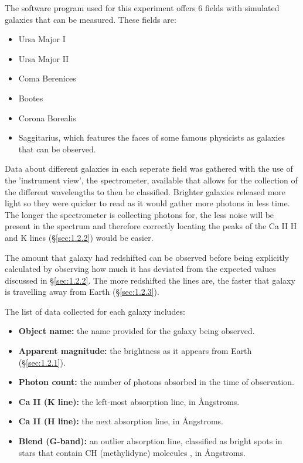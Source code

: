 \documentclass[12pt]{article}
\begin{document}
The software program used for this experiment offers 6 fields with simulated galaxies that can be measured. These fields are:

\begin{itemize}
    \item Ursa Major I
    \item Ursa Major II
    \item Coma Berenices
    \item Bootes
    \item Corona Borealis
    \item Saggitarius, which features the faces of some famous physicists as galaxies that can be observed.
\end{itemize}

Data about different galaxies in each seperate field was gathered with the use of the 'instrument view', the spectrometer, available that allows for the collection of the different
wavelengths to then be classified. Brighter galaxies released more light so they were quicker to read as it would gather more photons in less time. The longer
the spectrometer is collecting photons for, the less noise will be present in the spectrum and therefore correctly locating the peaks of the Ca II H and K lines (§\ref{sec:1.2.2}) would be easier.

The amount that galaxy had redshifted can be observed before being explicitly calculated by observing how much it has deviated from the expected values discussed in §\ref{sec:1.2.2}.
The more redshifted the lines are, the faster that galaxy is travelling away from Earth (§\ref{sec:1.2.3}).

The list of data collected for each galaxy includes:

\begin{itemize}
    \item \textbf{Object name:} the name provided for the galaxy being observed.
    \item \textbf{Apparent magnitude:} the brightness as it appears from Earth (§\ref{sec:1.2.1}).
    \item \textbf{Photon count:} the number of photons absorbed in the time of observation.
    \item \textbf{Ca II (K line):} the left-most absorption line, in Ångstroms.
    \item \textbf{Ca II (H line):} the next absorption line, in Ångstroms.
    \item \textbf{Blend (G-band):} an outlier absorption line, classified as bright spots in stars that contain CH (methylidyne) molecules \cite{gband}, in Ångstroms.
\end{itemize}
\end{document}

